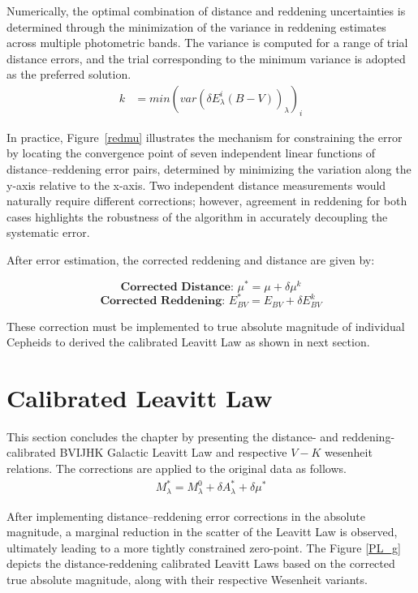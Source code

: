 Numerically, the optimal combination of distance and reddening uncertainties is determined through the minimization of the variance in reddening estimates across multiple photometric bands. The variance is computed for a range of trial distance errors, and the trial corresponding to the minimum variance is adopted as the preferred solution.
\begin{align}
	k & = min(var(\delta E^i_\lambda(B-V))_\lambda)_i  
\end{align}

In practice, Figure~\ref{redmu} illustrates the mechanism for constraining the error by locating the convergence point of seven independent linear functions of distance--reddening error pairs, determined by minimizing the variation along the y-axis relative to the x-axis. Two independent distance measurements would naturally require different corrections; however, agreement in reddening for both cases highlights the robustness of the algorithm in accurately decoupling the systematic error.



After error estimation, the corrected reddening and distance are given by:

$$\mathrm{\textbf{Corrected Distance:  }}  \mu^{*} = \mu + \delta \mu^k $$
$$\mathrm{\textbf{Corrected Reddening:  }}  E_{BV}^* = E_{BV} + \delta E_{BV}^k$$

These correction must be implemented to true absolute magnitude of individual Cepheids to derived the calibrated Leavitt Law as shown in next section.

\section{Calibrated Leavitt Law}

This section concludes the chapter by presenting the distance- and reddening-calibrated BVIJHK Galactic Leavitt Law and respective $V-K$ wesenheit relations. The corrections are applied to the original data as follows.
\begin{align*}
    M_\lambda^* = M_\lambda^0 + \delta A_\lambda^* + \delta \mu^*
\end{align*}



After implementing distance--reddening error corrections in the absolute magnitude, a marginal reduction in the scatter of the Leavitt Law is observed, ultimately leading to a more tightly constrained zero-point. The Figure \ref{PL_g} depicts the distance-reddening calibrated Leavitt Laws based on the corrected true absolute magnitude, along with their respective Wesenheit variants. 

